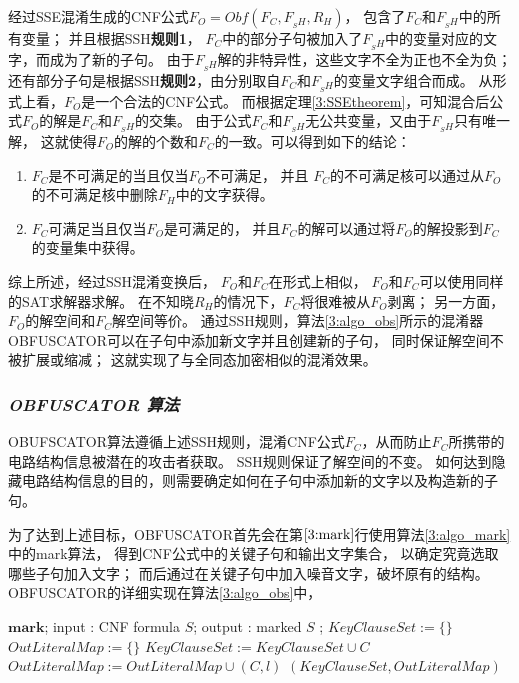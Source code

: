 经过SSE混淆生成的CNF公式$F_O=Obf(F_C,F_{_SH},R_H)$，
包含了$F_C$和$F_{_SH}$中的所有变量；
并且根据SSH\textbf{规则1}，
$F_C$中的部分子句被加入了$F_{_SH}$中的变量对应的文字，而成为了新的子句。
由于$F_{_SH}$解的非特异性，这些文字不全为正也不全为负；
还有部分子句是根据SSH\textbf{规则2}，由分别取自$F_C$和$F_{_SH}$的变量文字组合而成。
从形式上看，$F_O$是一个合法的CNF公式。
而根据定理\ref{3:SSEtheorem}，可知混合后公式$F_O$的解是$F_C$和$F_{_SH}$的交集。
由于公式$F_C$和$F_{_SH}$无公共变量，又由于$F_{_SH}$只有唯一解，
这就使得$F_O$的解的个数和$F_C$的一致。可以得到如下的结论：

%
%
\begin{enumerate}
 \item $F_C$是不可满足的当且仅当$F_O$不可满足，
 并且 $F_C$的不可满足核可以通过从$F_O$的不可满足核中删除$F_H$中的文字获得。
 \item $F_C$可满足当且仅当$F_O$是可满足的，
 并且$F_C$的解可以通过将$F_O$的解投影到$F_C$的变量集中获得。
\end{enumerate}



综上所述，经过SSH混淆变换后，
$F_O$和$F_C$在形式上相似，
$F_O$和$F_C$可以使用同样的SAT求解器求解。
在不知晓$R_H$的情况下，$F_C$将很难被从$F_O$剥离；
另一方面，$F_O$的解空间和$F_C$解空间等价。
通过SSH规则，算法\ref{3:algo_obs}所示的混淆器OBFUSCATOR可以在子句中添加新文字并且创建新的子句，
同时保证解空间不被扩展或缩减；
这就实现了与全同态加密相似的混淆效果。


\subsubsection{\textsl{OBFUSCATOR 算法}}

OBUFSCATOR算法遵循上述SSH规则，混淆CNF公式$F_C$，从而防止$F_C$所携带的电路结构信息被潜在的攻击者获取。
SSH规则保证了解空间的不变。
如何达到隐藏电路结构信息的目的，则需要确定如何在子句中添加新的文字以及构造新的子句。

为了达到上述目标，OBFUSCATOR首先会在第$\ref{3:mark}$行使用算法\ref{3:algo_mark}中的mark算法，
得到CNF公式中的关键子句和输出文字集合，
以确定究竟选取哪些子句加入文字；
而后通过在关键子句中加入噪音文字，破坏原有的结构。
OBFUSCATOR的详细实现在算法\ref{3:algo_obs}中，


\begin{algorithm}[t]
\caption{$\mathbf{mark}$}
\label{3:algo_mark}
\begin{algorithmic}[1]
\STATE $\mathbf{mark}$;
\STATE input : CNF formula $S$;
\STATE output : marked $S$ ;
\STATE $KeyClauseSet := \{\}$
\STATE $OutLiteralMap := \{\}$
\STATE $KeyClauseSet := KeyClauseSet\cup C$
\STATE $OutLiteralMap := OutLiteralMap\cup (C,l)$
\ENDFOR
\ENDIF
\ENDFOR
\RETURN $(KeyClauseSet,OutLiteralMap)$
\end{algorithmic}
\end{algorithm}

